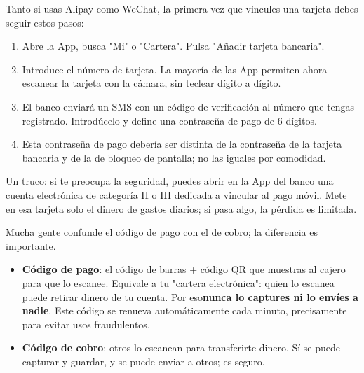 


Tanto si usas Alipay como WeChat, la primera vez que vincules una tarjeta debes seguir estos pasos:

\begin{enumerate}
  \item Abre la App, busca "Mi" o "Cartera". Pulsa "Añadir tarjeta bancaria".
  \item Introduce el número de tarjeta. La mayoría de las App permiten ahora escanear la tarjeta con la cámara, sin teclear dígito a dígito.
  \item El banco enviará un SMS con un código de verificación al número que tengas registrado. Introdúcelo y define una contraseña de pago de 6 dígitos.
  \item Esta contraseña de pago debería ser distinta de la contraseña de la tarjeta bancaria y de la de bloqueo de pantalla; no las iguales por comodidad.
\end{enumerate}

Un truco: si te preocupa la seguridad, puedes abrir en la App del banco una cuenta electrónica de categoría II o III dedicada a vincular al pago móvil. Mete en esa tarjeta solo el dinero de gastos diarios; si pasa algo, la pérdida es limitada.


Mucha gente confunde el código de pago con el de cobro; la diferencia es importante.

\begin{itemize}
  \item \textbf{Código de pago}: el código de barras + código QR que muestras al cajero para que lo escanee. Equivale a tu "cartera electrónica": quien lo escanea puede retirar dinero de tu cuenta. Por eso\textbf{nunca lo captures ni lo envíes a nadie}. Este código se renueva automáticamente cada minuto, precisamente para evitar usos fraudulentos.
  \item \textbf{Código de cobro}: otros lo escanean para transferirte dinero. Sí se puede capturar y guardar, y se puede enviar a otros; es seguro.
\end{itemize}

